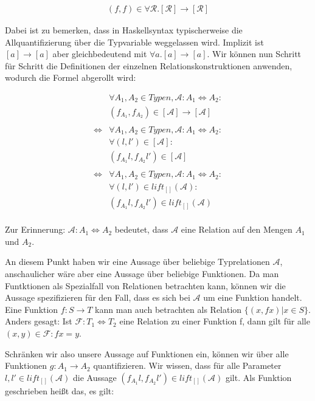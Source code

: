 \begin{align}
(f, f) \in \forall \mathcal{R} . [\mathcal{R}] \rightarrow [\mathcal{R}]
\end{align}

Dabei ist zu bemerken, dass in Haskellsyntax typischerweise die Allquantifizierung über die Typvariable weggelassen wird.
Implizit ist $[a] \rightarrow [a]$ aber gleichbedeutend mit $\forall a . [a] \rightarrow [a]$.
Wir können nun Schritt für Schritt die Definitionen der einzelnen Relationskonstruktionen anwenden, wodurch die Formel
abgerollt wird:

\begin{align*}
&\forall A_1, A_2 \in Typen, \mathcal{A} : A_1 \Leftrightarrow A_2: \\
&(f_{A_1}, f_{A_2}) \in [\mathcal{A}] \rightarrow [\mathcal{A}] \\
& \\
\Leftrightarrow &
\forall A_1, A_2 \in Typen, \mathcal{A} : A_1 \Leftrightarrow A_2: \\
& \forall (l, l') \in [\mathcal{A}]: \\
&(f_{A_1} l, f_{A_2} l') \in [\mathcal{A}] \\
& \\
\Leftrightarrow &
\forall A_1, A_2 \in Typen, \mathcal{A} : A_1 \Leftrightarrow A_2: \\
& \forall (l, l') \in lift_{[]}(\mathcal{A}): \\
& (f_{A_1} l, f_{A_2} l') \in lift_{[]}(\mathcal{A}) \\
\end{align*}

Zur Erinnerung: $\mathcal{A} : A_1 \Leftrightarrow A_2$ bedeutet, dass $\mathcal{A}$ eine Relation auf den Mengen $A_1$ und $A_2$.

An diesem Punkt haben wir eine Aussage über beliebige Typrelationen $\mathcal{A}$, anschaulicher wäre aber eine Aussage
über beliebige Funktionen. Da man Funtktionen als Spezialfall von Relationen betrachten kann, können wir die Aussage
spezifizieren für den Fall, dass es sich bei $\mathcal{A}$ um eine Funktion handelt.
Eine Funktion $f : S \rightarrow T$ kann man auch betrachten als Relation $\{ (x, f x) | x \in S \}$. Anders gesagt: Ist
$\mathcal{F} : T_1 \Leftrightarrow T_2$ eine Relation zu einer Funktion f, dann gilt für alle $(x, y) \in \mathcal{F}: f x = y$.

Schränken wir also unsere Aussage auf Funktionen ein, können wir über alle Funktionen $g : A_1 \rightarrow A_2$ quantifizieren.
Wir wissen, dass für alle Parameter $l, l' \in lift_{[]}(\mathcal{A})$ die Aussage $(f_{A_1} l, f_{A_2} l') \in lift_{[]}(\mathcal{A})$
gilt. Als Funktion geschrieben heißt das, es gilt:

